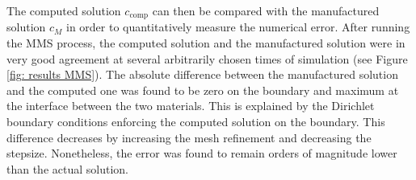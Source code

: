 The computed solution $c_\mathrm{comp}$ can then be compared with the manufactured solution $c_M$ in order to quantitatively measure the numerical error.
After running the MMS process, the computed solution and the manufactured solution were in very good agreement at several arbitrarily chosen times of simulation (see Figure \ref{fig: results MMS}).
The absolute difference between the manufactured solution and the computed one was found to be zero on the boundary and maximum at the interface between the two materials.
This is explained by the Dirichlet boundary conditions enforcing the computed solution on the boundary.
This difference decreases by increasing the mesh refinement and decreasing the stepsize.
Nonetheless, the error was found to remain orders of magnitude lower than the actual solution.

